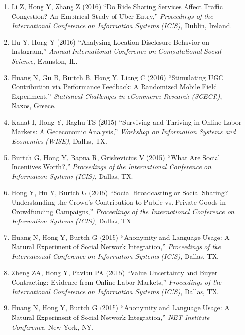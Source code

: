 \documentclass[paper=letter,fontsize=10pt]{scrartcl} %
\newcommand{\ConfEntry}[6]{
		\noindent #1 (#2) ``#3,'' \textit{#4}, #5. \textcolor{blue}{#6}}
\newcommand{\Hong}{Hong Y}
\begin{document}
\begin{enumerate}
\item \ConfEntry{Li Z, \Hong, Zhang Z}{2016}{Do Ride Sharing Services Affect Traffic Congestion? An Empirical Study of Uber Entry}{Proceedings of the International Conference on Information Systems (ICIS)}{Dublin, Ireland}{}

\item \ConfEntry{Hu Y, \Hong}{2016}{Analyzing Location Disclosure Behavior on Instagram}{Annual International Conference on Computational Social Science}{Evanston, IL}{}

\item \ConfEntry{Huang N, Gu B, Burtch B, \Hong, Liang C}{2016}{Stimulating UGC Contribution via Performance Feedback: A Randomized Mobile Field Experiment}{Statistical Challenges in eCommerce Research (SCECR)}{Naxos, Greece}{}

\item \ConfEntry{Kanat I, \Hong, Raghu TS}{2015}{Surviving and Thriving in Online Labor Markets: A Geoeconomic Analysis}{Workshop on Information Systems and Economics (WISE)}{Dallas, TX}{}

\item \ConfEntry{Burtch G, \Hong, Bapna R, Griskevicius V}{2015}{What Are Social Incentives Worth?}{Proceedings of the International Conference on Information Systems (ICIS)}{Dallas, TX}{}

\item \ConfEntry{\Hong, Hu Y, Burtch G}{2015}{Social Broadcasting or Social Sharing? Understanding the Crowd's Contribution to Public vs. Private Goods in Crowdfunding Campaigns}{Proceedings of the International Conference on Information Systems (ICIS)}{Dallas, TX}{}

\item \ConfEntry{Huang N, \Hong, Burtch G}{2015}{Anonymity and Language Usage: A Natural Experiment of Social Network Integration}{Proceedings of the International Conference on Information Systems (ICIS)}{Dallas, TX}{}

\item \ConfEntry{Zheng ZA, \Hong, Pavlou PA}{2015}{Value Uncertainty and Buyer Contracting: Evidence from Online Labor Markets}{Proceedings of the International Conference on Information Systems (ICIS)}{Dallas, TX}{}

\item \ConfEntry{Huang N, \Hong, Burtch G}{2015}{Anonymity and Language Usage: A Natural Experiment of Social Network Integration}{NET Institute Conference}{New York, NY}{}


\end{enumerate}
\end{document}

